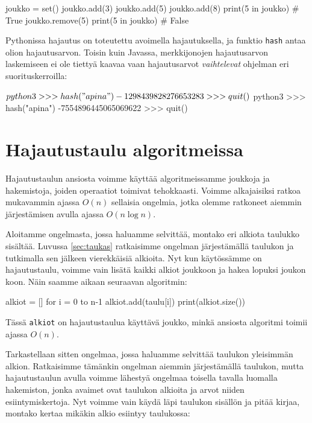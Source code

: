 \begin{code}
joukko = set()
joukko.add(3)
joukko.add(5)
joukko.add(8)
print(5 in joukko) # True
joukko.remove(5)
print(5 in joukko) # False
\end{code}

Pythonissa hajautus on toteutettu avoimella hajautuksella,
ja funktio \texttt{hash} antaa olion hajautusarvon.
Toisin kuin Javassa, merkkijonojen hajautusarvon laskemiseen
ei ole tiettyä kaavaa vaan hajautusarvot \emph{vaihtelevat}
ohjelman eri suorituskerroilla:

\begin{code}
$ python3
>>> hash("apina")
-1298439828276653283
>>> quit()
$ python3
>>> hash("apina")
-7554896445065069622
>>> quit()
\end{code}

\section{Hajautustaulu algoritmeissa}

Hajautustaulun ansiosta voimme käyttää algoritmeissamme
joukkoja ja hakemistoja, joiden operaatiot toimivat tehokkaasti.
Voimme alkajaisiksi ratkoa mukavammin ajassa $O(n)$ sellaisia ongelmia,
jotka olemme ratkoneet aiemmin järjestämisen avulla ajassa $O(n \log n)$.

Aloitamme ongelmasta, jossa haluamme selvittää,
montako eri alkiota taulukko sisältää.
Luvussa \ref{sec:taukas} ratkaisimme ongelman
järjestämällä taulukon ja tutkimalla sen jälkeen
vierekkäisiä alkioita.
Nyt kun käytös\-sämme on hajautustaulu, voimme vain lisätä
kaikki alkiot joukkoon ja hakea lopuksi joukon koon.
Näin saamme aikaan seuraavan algoritmin:

\begin{code}
alkiot = []
for i = 0 to n-1
    alkiot.add(taulu[i])
print(alkiot.size())
\end{code}

Tässä \texttt{alkiot} on hajautustaulua käyttävä joukko,
minkä ansiosta algoritmi toimii ajassa $O(n)$.

Tarkastellaan sitten ongelmaa, jossa haluamme selvittää
taulukon yleisimmän alkion.
Ratkaisimme tämänkin ongelman aiemmin
järjestä\-mällä taulukon, mutta
hajautustaulun avulla voimme lähestyä ongelmaa
toisella tavalla luomalla hakemiston,
jonka avaimet ovat taulukon alkioita ja arvot niiden
esiintymiskertoja.
Nyt voimme vain käydä läpi taulukon sisällön ja
pitää kirjaa, montako kertaa mikäkin alkio esiintyy taulukossa:


